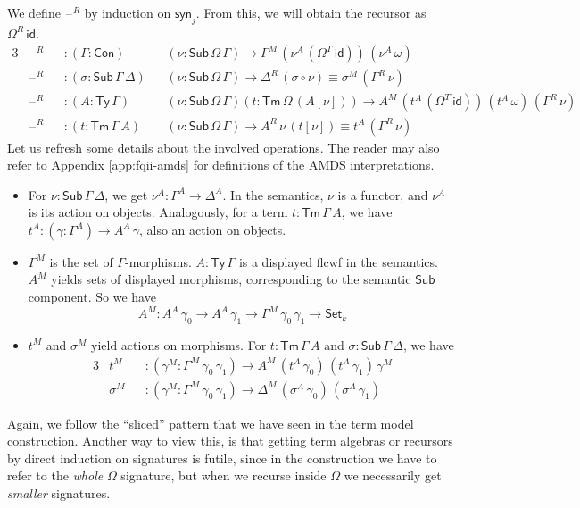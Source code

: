 \documentclass[12pt,a4paper,twoside,openany]{book}
\theoremstyle{remark}
\theoremstyle{definition}
\theoremstyle{theorem}
\newcommand{\id}{\mathsf{id}}
\newcommand{\Con}{\mathsf{Con}}
\newcommand{\Sub}{\mathsf{Sub}}
\newcommand{\Tm}{\mathsf{Tm}}
\newcommand{\Ty}{\mathsf{Ty}}
\newcommand{\blank}{\mathord{\hspace{1pt}\text{--}\hspace{1pt}}}
\newcommand{\Set}{\mathsf{Set}}
\newcommand{\syn}{\mathsf{syn}}
\begin{document}
We define $\blank^R$ by induction on $\syn_j$. From this, we will obtain the
recursor as $\Omega^R\,\id$.
\begin{alignat*}{3}
  &\blank^R &&: (\Gamma : \Con)&&(\nu : \Sub\,\Omega\,\Gamma) \to \Gamma^M\,(\nu^A\,(\Omega^T\,\id))\,(\nu^A\,\omega)\\
  &\blank^R &&: (\sigma : \Sub\,\Gamma\,\Delta)&&(\nu : \Sub\,\Omega\,\Gamma) \to \Delta^R\,(\sigma \circ \nu) \equiv \sigma^M\,(\Gamma^R\,\nu)\\
  &\blank^R &&: (A : \Ty\,\Gamma)&&(\nu : \Sub\,\Omega\,\Gamma)(t : \Tm\,\Omega\,(A[\nu]))
     \to A^M\,(t^A\,(\Omega^T\,\id))\,(t^A\,\omega)\,(\Gamma^R\,\nu)\\
  &\blank^R &&: (t : \Tm\,\Gamma\,A)&&(\nu : \Sub\,\Omega\,\Gamma) \to A^R\,\nu\,(t[\nu]) \equiv t^A\,(\Gamma^R\,\nu)
\end{alignat*}
Let us refresh some details about the involved operations. The reader may also
refer to Appendix \ref{app:fqii-amds} for definitions of the AMDS
interpretations.
\begin{itemize}
\item For $\nu : \Sub\,\Gamma\,\Delta$, we get $\nu^A : \Gamma^A \to \Delta^A$. In the semantics, $\nu$
  is a functor, and $\nu^A$ is its action on objects. Analogously, for a term $t : \Tm\,\Gamma\,A$, we
  have $t^A : (\gamma : \Gamma^A) \to A^A\,\gamma$, also an action on objects.
\item
  $\Gamma^M$ is the set of $\Gamma$-morphisms. $A : \Ty\,\Gamma$ is a displayed
  flcwf in the semantics. $A^M$ yields sets of displayed morphisms,
  corresponding to the semantic $\Sub$ component. So we have
  \[ A^M : A^A\,\gamma_0 \to A^A\,\gamma_1 \to \Gamma^M\,\gamma_0\,\gamma_1 \to \Set_{k} \]
\item $t^M$ and $\sigma^M$ yield actions on morphisms. For $t : \Tm\,\Gamma\,A$ and $\sigma : \Sub\,\Gamma\,\Delta$, we have
  \begin{alignat*}{3}
    &t^M      &&: (\gamma^M : \Gamma^M\,\gamma_0\,\gamma_1) \to A^M\,(t^A\,\gamma_0)\,(t^A\,\gamma_1)\,\gamma^M\\
    &\sigma^M &&: (\gamma^M : \Gamma^M\,\gamma_0\,\gamma_1) \to \Delta^M\,(\sigma^A\,\gamma_0)\,(\sigma^A\,\gamma_1)
  \end{alignat*}
\end{itemize}

Again, we follow the ``sliced'' pattern that we have seen in the term model
construction. Another way to view this, is that getting term algebras or
recursors by direct induction on signatures is futile, since in the
construction we have to refer to the \emph{whole} $\Omega$ signature, but when
we recurse inside $\Omega$ we necessarily get \emph{smaller} signatures.
\end{document}
